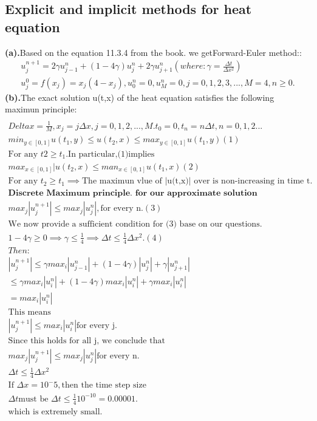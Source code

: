 \subsection{Explicit and implicit methods for heat equation}
\textbf{(a).}Based on the equation 11.3.4 from the book. we getForward-Euler method::
\[\begin{aligned}
u_j^{n+1}=2\gamma u_{j-1}^n+(1-4\gamma)u_j^n+2\gamma u_{j+1}^n(where:\gamma=\frac{\Delta t}{\Delta x^2})\\
u_j^0=f(x_j)=x_j(4-x_j),u_0^n=0,u_M^n=0,j=0,1,2,3,...,M=4,n\geq 0.
\end{aligned}\]
\textbf{(b).}The exact solution u(t,x) of the heat equation satisfies the following maximun principle:
\[\begin{aligned}
  \\Delta x=\frac{1}{M},x_j=j\Delta x,j=0,1,2,...,M.t_0=0,t_n=n\Delta t,n=0,1,2...\\
  min_{y\in[0,1]}u(t_1,y)\leq u(t_2,x)\leq max_{y\in[0,1]}u(t_1,y)(1)\\
  \text{For any }t2\geq t_1.\text{In particular,(1)implies}\\
  max_{x\in[0,1]}|u(t_2,x)\leq man_{x\in[0,1]}u(t_1,x)(2)\\
  \text{For any }t_2\geq t_1\implies \text{The maximun vlue of |u(t,x)| over is non-increasing in time t.}\\
  \textbf{Discrete Maximum principle. for our approximate solution}\\
  max_j|u_j^{n+1}|\leq max_{j}|u_j^n|,\text{for every n.}(3)\\
  \text{We now provide a sufficient condition for (3) base on our questions.}\\
  1-4\gamma\geq 0\implies \gamma\leq\frac{1}{4}\implies\Delta t\leq \frac{1}{4}\Delta x^2.(4)\\
  Then:\\
  |u_j^{n+1}|\leq \gamma max_i|u_{j-1}^n|+(1-4\gamma)|u_j^n|+\gamma|u_{j+1}^n|\\
  \leq \gamma max_i|u_{i}^n|+(1-4\gamma)max_i|u_i^n|+\gamma max_i|u_i^n|\\
  =max_i|u_i^n|\\
  \text{This means}\\
  |u_j^{n+1}|\leq max_i|u_i^n|\text{for every j.}\\
  \text{Since this holds for all j, we conclude that}\\
  max_j|u_j^{n+1}|\leq max_j|u_j^n|\text{for every n.}\\
  \Delta t\leq\frac{1}{4}\Delta x^2\\
  \text{If }\Delta x=10^-5,\text{then the time step size }\\
  \Delta t\text{must be }\Delta t\leq \frac{1}{4}10^{-10}=0.00001.\\
  \text{which is extremely small.}\\
\end{aligned}\]



